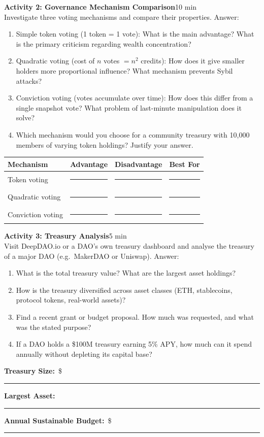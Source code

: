 \documentclass[11pt,a4paper]{article}
\newcommand{\activitybox}[3]{%
  \noindent\colorbox{mllavender4}{\parbox{\dimexpr\linewidth-2\fboxsep}{%
    \textbf{\color{mlpurple}#1}\hfill\textcolor{mlgray}{\small #2}\\[2pt]#3%
  }}\par\vspace{4pt}%
}
\newcommand{\fillcell}{\rule{2.2cm}{0.3pt}}
\begin{document}
\activitybox{Activity 2: Governance Mechanism Comparison}{10 min}{%
Investigate three voting mechanisms and compare their properties. Answer:
\begin{enumerate}
\item Simple token voting (1 token = 1 vote): What is the main advantage? What is the primary criticism regarding wealth concentration?
\item Quadratic voting (cost of $n$ votes $= n^2$ credits): How does it give smaller holders more proportional influence? What mechanism prevents Sybil attacks?
\item Conviction voting (votes accumulate over time): How does this differ from a single snapshot vote? What problem of last-minute manipulation does it solve?
\item Which mechanism would you choose for a community treasury with 10{,}000 members of varying token holdings? Justify your answer.
\end{enumerate}
\vspace{4pt}
{\footnotesize\renewcommand{\arraystretch}{1.35}%
\setlength{\tabcolsep}{5pt}%
\begin{tabular}{@{}llll@{}}
\toprule
\textbf{Mechanism} & \textbf{Advantage} & \textbf{Disadvantage} & \textbf{Best For} \\
\midrule
Token voting     & \fillcell & \fillcell & \fillcell \\
Quadratic voting & \fillcell & \fillcell & \fillcell \\
Conviction voting & \fillcell & \fillcell & \fillcell \\
\bottomrule
\end{tabular}}
\vspace{2pt}
}

\vspace{2pt}

\activitybox{Activity 3: Treasury Analysis}{5 min}{%
Visit DeepDAO.io or a DAO's own treasury dashboard and analyse the treasury of a major DAO (e.g.\ MakerDAO or Uniswap). Answer:
\begin{enumerate}
\item What is the total treasury value? What are the largest asset holdings?
\item How is the treasury diversified across asset classes (ETH, stablecoins, protocol tokens, real-world assets)?
\item Find a recent grant or budget proposal. How much was requested, and what was the stated purpose?
\item If a DAO holds a \$100M treasury earning 5\% APY, how much can it spend annually without depleting its capital base?
\end{enumerate}
\vspace{4pt}
\noindent
\textbf{Treasury Size:}~\$\fillcell\quad
\textbf{Largest Asset:}~\fillcell\quad
\textbf{Annual Sustainable Budget:}~\$\fillcell
\vspace{2pt}
}
\end{document}
